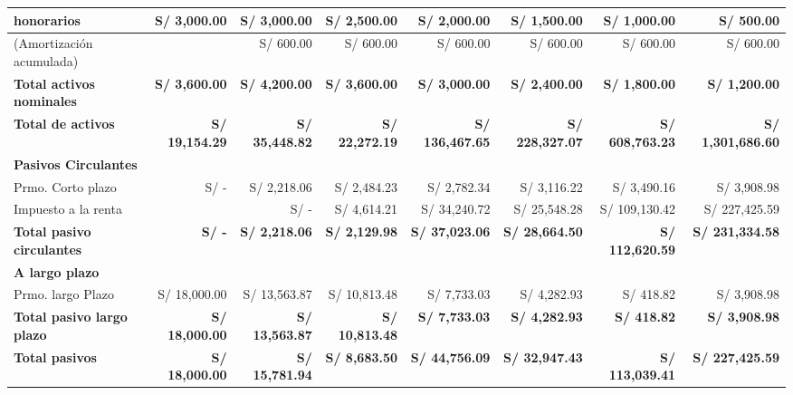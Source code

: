 \begin{table}[H]
{\begin{tabular}{|p{3.6cm}|r|r|r|r|r|r|r|}
honorarios 
& S/ 3,000.00 & S/ 3,000.00 & S/ 2,500.00 & S/ 2,000.00 & S/ 1,500.00 & S/ 1,000.00 & S/ 500.00 \\ \hline

(Amortización acumulada) 
&  & S/ 600.00 & S/ 600.00 & S/ 600.00 & S/ 600.00 & S/ 600.00 & S/ 600.00 \\ \hline

\textbf{Total activos nominales} 
& \textbf{S/ 3,600.00} & \textbf{S/ 4,200.00} & \textbf{S/ 3,600.00} & \textbf{S/ 3,000.00} & \textbf{S/ 2,400.00} & \textbf{S/ 1,800.00} & \textbf{S/ 1,200.00} \\ \hline

\textbf{Total de activos} 
& \textbf{S/ 19,154.29} & \textbf{S/ 35,448.82} & \textbf{S/ 22,272.19} & \textbf{S/ 136,467.65} & \textbf{S/ 228,327.07} & \textbf{S/ 608,763.23} & \textbf{S/ 1,301,686.60} \\ \hline

\multicolumn{8}{|l|}{\textbf{Pasivos Circulantes}} \\ \hline
Prmo. Corto plazo 
& S/ - & S/ 2,218.06 & S/ 2,484.23 & S/ 2,782.34 & S/ 3,116.22 & S/ 3,490.16 & S/ 3,908.98 \\ \hline

Impuesto a la renta 
&  & S/ - & S/ 4,614.21 & S/ 34,240.72 & S/ 25,548.28 & S/ 109,130.42 & S/ 227,425.59 \\ \hline

\textbf{Total pasivo circulantes} 
& \textbf{S/ -} & \textbf{S/ 2,218.06} & \textbf{S/ 2,129.98} & \textbf{S/ 37,023.06} & \textbf{S/ 28,664.50} & \textbf{S/ 112,620.59} & \textbf{S/ 231,334.58} \\ \hline

\multicolumn{8}{|l|}{\textbf{A largo plazo}} \\ \hline
Prmo. largo Plazo 
& S/ 18,000.00 & S/ 13,563.87 & S/ 10,813.48 & S/ 7,733.03 & S/ 4,282.93 & S/ 418.82 & S/ 3,908.98 \\ \hline

\textbf{Total pasivo largo plazo} 
& \textbf{S/ 18,000.00} & \textbf{S/ 13,563.87} & \textbf{S/ 10,813.48} & \textbf{S/ 7,733.03} & \textbf{S/ 4,282.93} & \textbf{S/ 418.82} & \textbf{S/ 3,908.98} \\ \hline

\textbf{Total pasivos} 
& \textbf{S/ 18,000.00} & \textbf{S/ 15,781.94} & \textbf{S/ 8,683.50} & \textbf{S/ 44,756.09} & \textbf{S/ 32,947.43} & \textbf{S/ 113,039.41} & \textbf{S/ 227,425.59} \\ \hline


\end{tabular}}
\end{table}
